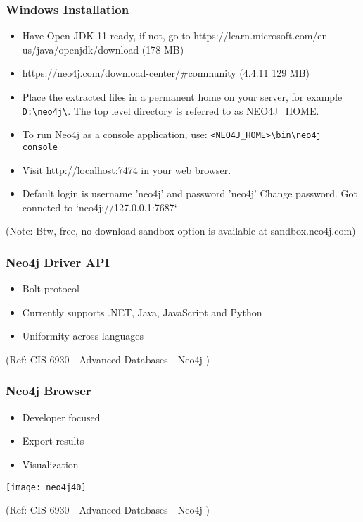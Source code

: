 \begin{frame}[fragile]\frametitle{Windows Installation}

\begin{itemize}
\item Have Open JDK 11 ready, if not, go to https://learn.microsoft.com/en-us/java/openjdk/download (178 MB)
\item https://neo4j.com/download-center/\#community (4.4.11 129 MB)
\item Place the extracted files in a permanent home on your server, for example \lstinline|D:\neo4j\|. The top level directory is referred to as NEO4J\_HOME.
\item To run Neo4j as a console application, use: \lstinline|<NEO4J_HOME>\bin\neo4j console|


\item Visit http://localhost:7474 in your web browser.
\item Default login is username 'neo4j' and password 'neo4j' Change password. Got conncted to `neo4j://127.0.0.1:7687`
\end{itemize}

(Note: Btw, free, no-download sandbox option is available at sandbox.neo4j.com)
\end{frame}

\begin{frame}\frametitle{Neo4j Driver API}


\begin{itemize}
\item  Bolt protocol
\item   Currently supports .NET, Java, JavaScript and Python
\item   Uniformity across languages
\end{itemize}


{\tiny (Ref: CIS 6930 - Advanced Databases - Neo4j )}
\end{frame}

\begin{frame}\frametitle{Neo4j Browser}


\begin{itemize}
\item   Developer focused
\item    Export results
\item   Visualization
\end{itemize}

\begin{center}
\texttt{[image: neo4j40]}
\end{center}	 

{\tiny (Ref: CIS 6930 - Advanced Databases - Neo4j )}
\end{frame}



